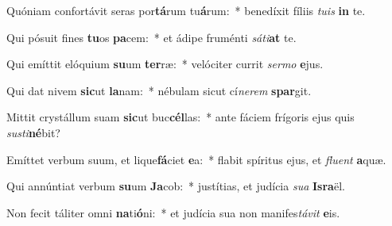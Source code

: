\item Quóniam confortávit seras por\textbf{tá}rum tu\textbf{á}rum:~* benedíxit fíliis \textit{tu}\textit{is} \textbf{in} te.
\item Qui pósuit fines \textbf{tu}os \textbf{pa}cem:~* et ádipe fruménti \textit{sá}\textit{ti}\textbf{at} te.
\item Qui emíttit elóquium \textbf{su}um \textbf{ter}ræ:~* velóciter currit \textit{ser}\textit{mo} \textbf{e}jus.
\item Qui dat nivem \textbf{sic}ut \textbf{la}nam:~* nébulam sicut cí\textit{ne}\textit{rem} \textbf{spar}git.
\item Mittit crystállum suam \textbf{sic}ut buc\textbf{cél}las:~* ante fáciem frígoris ejus quis \textit{sus}\textit{ti}\textbf{né}bit?
\item Emíttet verbum suum, et lique\textbf{fá}ciet \textbf{e}a:~* flabit spíritus ejus, et \textit{flu}\textit{ent} \textbf{a}quæ.
\item Qui annúntiat verbum \textbf{su}um \textbf{Ja}cob:~* justítias, et judícia \textit{su}\textit{a} \textbf{Is}\textbf{ra}ël.
\item Non fecit táliter omni \textbf{na}ti\textbf{ó}ni:~* et judícia sua non manifes\textit{tá}\textit{vit} \textbf{e}is.
